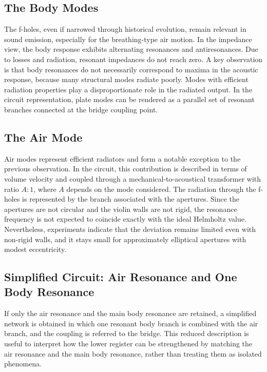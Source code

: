\subsection{The Body Modes}

The f-holes, even if narrowed through historical evolution, remain relevant in sound emission, especially for the breathing-type air motion. In the impedance view, the body response exhibits alternating resonances and antiresonances. Due to losses and radiation, resonant impedances do not reach zero. A key observation is that body resonances do not necessarily correspond to maxima in the acoustic response, because many structural modes radiate poorly. Modes with efficient radiation properties play a disproportionate role in the radiated output. In the circuit representation, plate modes can be rendered as a parallel set of resonant branches connected at the bridge coupling point. 

\subsection{The Air Mode}

Air modes represent efficient radiators and form a notable exception to the previous observation. In the circuit, this contribution is described in terms of volume velocity and coupled through a mechanical-to-acoustical transformer with ratio \( A:1 \), where \( A \) depends on the mode considered. The radiation through the f-holes is represented by the branch associated with the apertures. Since the apertures are not circular and the violin walls are not rigid, the resonance frequency is not expected to coincide exactly with the ideal Helmholtz value. Nevertheless, experiments indicate that the deviation remains limited even with non-rigid walls, and it stays small for approximately elliptical apertures with modest eccentricity. 

\subsection{Simplified Circuit: Air Resonance and One Body Resonance}

If only the air resonance and the main body resonance are retained, a simplified network is obtained in which one resonant body branch is combined with the air branch, and the coupling is referred to the bridge. This reduced description is useful to interpret how the lower register can be strengthened by matching the air resonance and the main body resonance, rather than treating them as isolated phenomena.

